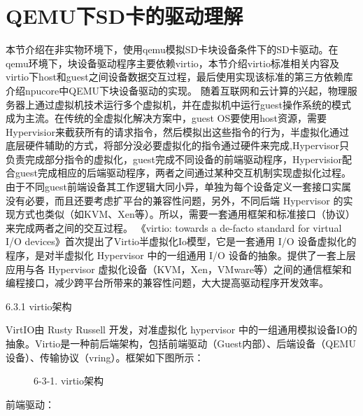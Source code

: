 \section{QEMU下SD卡的驱动理解}
本节介绍在非实物环境下，使用qemu模拟SD卡块设备条件下的SD卡驱动。在qemu环境下，块设备驱动程序主要依赖virtio，本节介绍virtio标准相关内容及virtio下host和guest之间设备数据交互过程，最后使用实现该标准的第三⽅依赖库介绍npucore中QEMU下块设备驱动的实现。
随着互联网和云计算的兴起，物理服务器上通过虚拟机技术运行多个虚拟机，并在虚拟机中运行guest操作系统的模式成为主流。在传统的全虚拟化解决方案中，guest OS要使用host资源，需要Hypervisior来截获所有的请求指令，然后模拟出这些指令的行为，半虚拟化通过底层硬件辅助的方式，将部分没必要虚拟化的指令通过硬件来完成,Hypervisor只负责完成部分指令的虚拟化，guest完成不同设备的前端驱动程序，Hypervisior配合guest完成相应的后端驱动程序，两者之间通过某种交互机制实现虚拟化过程。由于不同guest前端设备其工作逻辑大同小异，单独为每个设备定义一套接口实属没有必要，而且还要考虑扩平台的兼容性问题，另外，不同后端 Hypervisor 的实现方式也类似（如KVM、Xen等）。所以，需要⼀套通用框架和标准接口（协议）来完成两者之间的交互过程。
《virtio: towards a de-facto standard for virtual I/O devices》首次提出了Virtio半虚拟化Io模型，它是⼀套通用 I/O 设备虚拟化的程序，是对半虚拟化 Hypervisor 中的⼀组通用 I/O 设备的抽象。提供了⼀套上层应⽤与各 Hypervisor 虚拟化设备（KVM，Xen，VMware等）之间的通信框架和编程接口，减少跨平台所带来的兼容性问题，大大提高驱动程序开发效率。

6.3.1 virtio架构

VirtIO由 Rusty Russell 开发，对准虚拟化 hypervisor 中的一组通用模拟设备IO的抽象。Virtio是一种前后端架构，包括前端驱动（Guest内部）、后端设备（QEMU设备）、传输协议（vring）。框架如下图所示：

 
\begin{figure}[H]
    \centering
    \caption{6-3-1. virtio架构}
\end{figure}
前端驱动：

